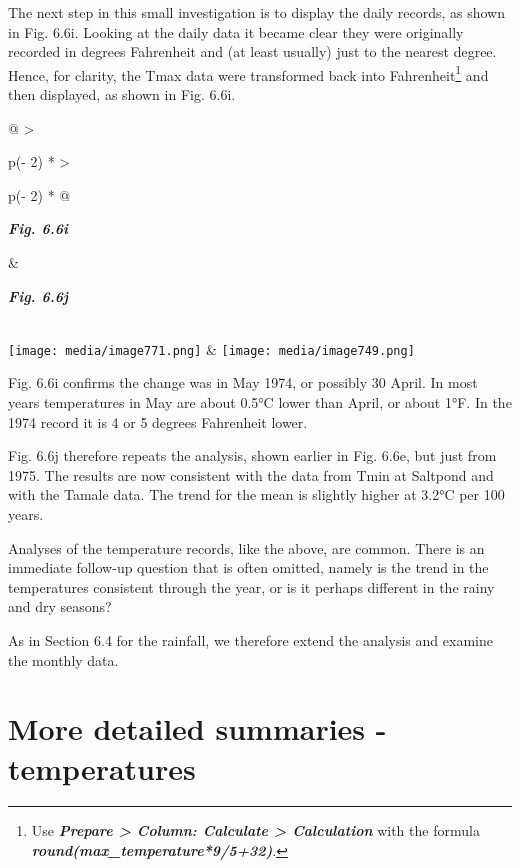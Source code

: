 \documentclass[
  letterpaper,
  DIV=11,
  numbers=noendperiod]{scrreprt}
\begin{document}
The next step in this small investigation is to display the daily
records, as shown in Fig. 6.6i. Looking at the daily data it became
clear they were originally recorded in degrees Fahrenheit and (at least
usually) just to the nearest degree. Hence, for clarity, the Tmax data
were transformed back into Fahrenheit\footnote{Use \textbf{\emph{Prepare
  \textgreater{} Column: Calculate \textgreater{} Calculation}} with the
  formula \textbf{\emph{round(max\_temperature*9/5+32)}}.} and then
displayed, as shown in Fig. 6.6i.

\begin{longtable}[]{@{}
  >{\raggedright\arraybackslash}p{(\columnwidth - 2\tabcolsep) * }
  >{\raggedright\arraybackslash}p{(\columnwidth - 2\tabcolsep) * }@{}}
\toprule\noalign{}
\begin{minipage}[b]{\linewidth}\raggedright
\textbf{\emph{Fig. 6.6i}}
\end{minipage} & \begin{minipage}[b]{\linewidth}\raggedright
\textbf{\emph{Fig. 6.6j}}
\end{minipage} \\
\midrule\noalign{}
\endhead
\bottomrule\noalign{}
\endlastfoot
\texttt{[image: media/image771.png]} &
\texttt{[image: media/image749.png]} \\
\end{longtable}

Fig. 6.6i confirms the change was in May 1974, or possibly 30 April. In
most years temperatures in May are about 0.5°C lower than April, or
about 1°F. In the 1974 record it is 4 or 5 degrees Fahrenheit lower.

Fig. 6.6j therefore repeats the analysis, shown earlier in Fig. 6.6e,
but just from 1975. The results are now consistent with the data from
Tmin at Saltpond and with the Tamale data. The trend for the mean is
slightly higher at 3.2°C per 100 years.

Analyses of the temperature records, like the above, are common. There
is an immediate follow-up question that is often omitted, namely is the
trend in the temperatures consistent through the year, or is it perhaps
different in the rainy and dry seasons?

As in Section 6.4 for the rainfall, we therefore extend the analysis and
examine the monthly data.

\section{More detailed summaries -
temperatures}\label{more-detailed-summaries---temperatures}
\end{document}

